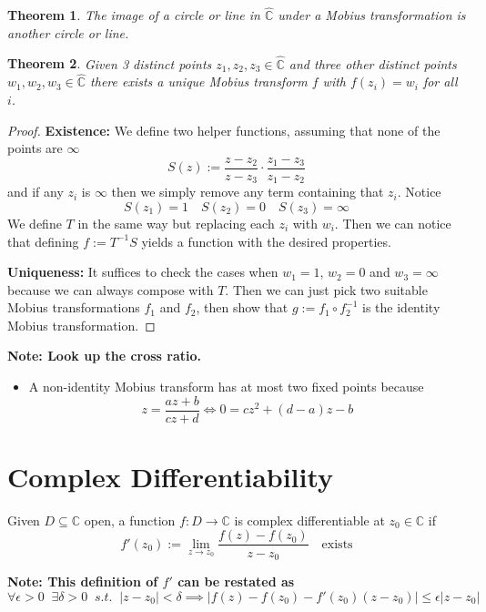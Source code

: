 \documentclass[11pt]{article}
\newcommand{\defeq}{:=}
\newcommand{\abs}[1]{\left|#1\right|}
\newcommand{\C}{\mathbb{C}}
\newenvironment{defin}
	{\begin{mdframed}[backgroundcolor=white, roundcorner=5pt, linewidth=1pt]}
	{\end{mdframed}}
\newcommand{\mdf}[1]{{\color{red} #1}}
\newenvironment{note}
	{\begin{mdframed}[backgroundcolor=white, linecolor=red, roundcorner=5pt, linewidth=1pt]\bfseries{Note:}\normalfont}
	{\end{mdframed}}
\newtheorem{theorem}{Theorem}[section]
\begin{document}
\begin{theorem}
The image of a circle or line in $\hat{\C}$ under a Mobius transformation is another circle or line.
\end{theorem}

\begin{theorem}
Given 3 distinct points $z_1, z_2, z_3\in\hat{\C}$ and three other distinct points $w_1, w_2, w_3\in\hat{\C}$ there exists a unique Mobius transform $f$ with $f(z_i)=w_i$ for all $i$.
\end{theorem}

\begin{proof}
\textbf{Existence: }
We define two helper functions, assuming that none of the points are $\infty$
\[
	S(z)\defeq\frac{z-z_2}{z-z_3}\cdot\frac{z_1-z_3}{z_1-z_2}
\]
and if any $z_i$ is $\infty$ then we simply remove any term containing that $z_i$.
Notice
\[
	S(z_1) = 1 \quad S(z_2) = 0 \quad S(z_3) = \infty
\]
We define $T$ in the same way but replacing each $z_i$ with $w_i$.
Then we can notice that defining $f\defeq T^{-1}S$ yields a function with the desired properties.

\textbf{Uniqueness: }
It suffices to check the cases when $w_1=1$, $w_2=0$ and $w_3=\infty$ because we can always compose with $T$.
Then we can just pick two suitable Mobius transformations $f_1$ and $f_2$, then show that $g\defeq f_1\circ f_2^{-1}$ is the identity Mobius transformation.
\end{proof}

\begin{note}
Look up the cross ratio.
\begin{itemize}
	\item A non-identity Mobius transform has at most two fixed points because
		\[
			z=\frac{az+b}{cz+d}\iff 0 =cz^2 + (d-a)z -b
		\]
\end{itemize}
\end{note}

\section{Complex Differentiability}

\begin{defin}
	Given $D\subseteq \C$ open, a function $f:D\to \C$ is \mdf{complex differentiable at $z_0\in\C$} if
	\[
		f'(z_0)\defeq\lim_{z\to z_0}\frac{f(z)-f(z_0)}{z-z_0}\quad\text{exists}
	\]
\end{defin}

\begin{note}
This definition of $f'$ can be restated as 
\[
	\forall \epsilon >0 \;\; \exists\delta >0 \;\; s.t. \;\; \abs{z- z_0} < \delta \implies \abs{f(z)-f(z_0)- f'(z_0)(z- z_0)} \leq \epsilon \abs{z- z_0}
\]
\end{note}
\end{document}
